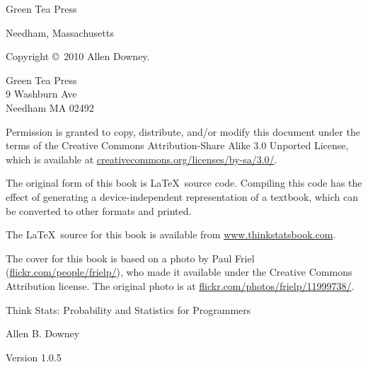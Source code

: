 \documentclass[12pt]{book}
\newcommand{\thetitle}{Think Stats: Probability and Statistics for Programmers}
\newcommand{\theversion}{1.0.5}
\begin{document}
\begin{latexonly}
\begin{flushright}
\vspace{0.5in}

{\Large Green Tea Press}

{\small Needham, Massachusetts}

\vfill

\end{flushright}


\pagebreak
\thispagestyle{empty}

{\small
Copyright \copyright ~2010 Allen Downey.


\vspace{0.2in}

\begin{flushleft}
Green Tea Press       \\
9 Washburn Ave \\
Needham MA 02492
\end{flushleft}

Permission is granted to copy, distribute, and/or modify this document
under the terms of the Creative Commons Attribution-Share Alike 3.0 Unported
License, which is available at \url{creativecommons.org/licenses/by-sa/3.0/}.

The original form of this book is \LaTeX\ source code.  Compiling this
code has the effect of generating a device-independent representation
of a textbook, which can be converted to other formats and printed.

The \LaTeX\ source for this book is available from
\url{www.thinkstatsbook.com}.

The cover for this book is based on a photo by Paul Friel
(\url{flickr.com/people/frielp/}), who made it available under
the Creative Commons Attribution license.  The original photo
is at \url{flickr.com/photos/frielp/11999738/}.

\vspace{0.2in}

} %

\end{latexonly}



\begin{htmlonly}


{\Large \thetitle}

{\large Allen B. Downey}

Version \theversion

\setcounter{chapter}{-1}

\end{htmlonly}
\end{document}
